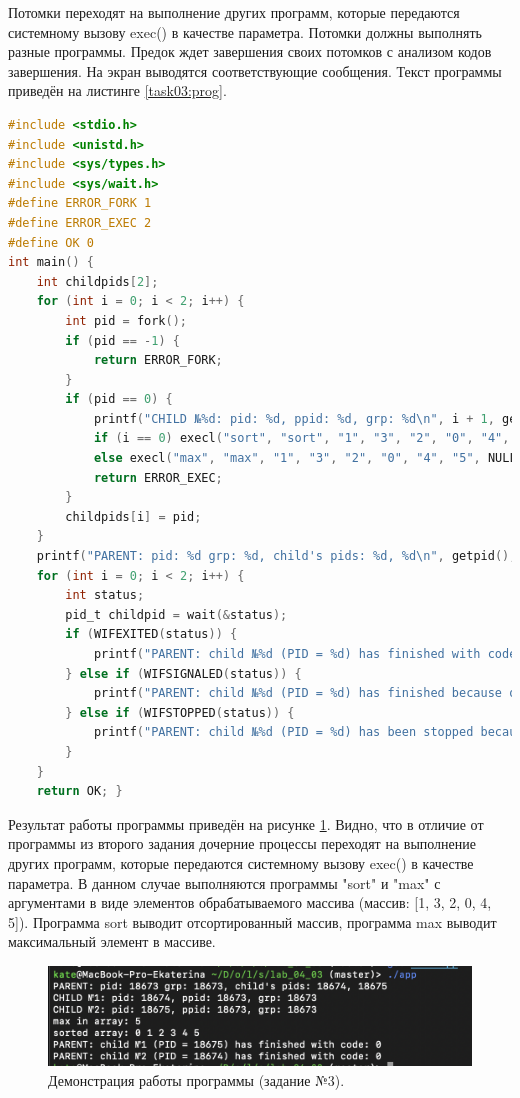 \documentclass[12pt]{report}
\begin{document}
Потомки переходят на выполнение других программ, которые передаются системному вызову exec() в качестве параметра. Потомки должны выполнять разные программы. Предок ждет завершения своих потомков с анализом кодов завершения. На экран выводятся соответствующие сообщения. Текст программы приведён на листинге \ref{task03:prog}.

\begin{lstlisting}[label=task03:prog,caption=Системный вызов exec(),language=C]
#include <stdio.h>
#include <unistd.h>
#include <sys/types.h>
#include <sys/wait.h>
#define ERROR_FORK 1
#define ERROR_EXEC 2
#define OK 0
int main() {
    int childpids[2];
    for (int i = 0; i < 2; i++) {
        int pid = fork();
        if (pid == -1) {
            return ERROR_FORK;
        }
        if (pid == 0) {
            printf("CHILD №%d: pid: %d, ppid: %d, grp: %d\n", i + 1, getpid(), getppid(), getpgrp());
            if (i == 0) execl("sort", "sort", "1", "3", "2", "0", "4", "5", NULL);
            else execl("max", "max", "1", "3", "2", "0", "4", "5", NULL);
            return ERROR_EXEC;
        }
        childpids[i] = pid;
    }
    printf("PARENT: pid: %d grp: %d, child's pids: %d, %d\n", getpid(), getpgrp(), childpids[0], childpids[1]);
    for (int i = 0; i < 2; i++) {
        int status;
        pid_t childpid = wait(&status);
        if (WIFEXITED(status)) {
            printf("PARENT: child №%d (PID = %d) has finished with code: %d\n", i + 1, childpid, WEXITSTATUS(status));
        } else if (WIFSIGNALED(status)) {
            printf("PARENT: child №%d (PID = %d) has finished because of signal: %d\n", i + 1, childpid, WTERMSIG(status));
        } else if (WIFSTOPPED(status)) {
            printf("PARENT: child №%d (PID = %d) has been stopped because of signal: %d\n", i + 1, childpid, WSTOPSIG(status));
        }
    }
    return OK; }
\end{lstlisting}

Результат работы программы приведён на рисунке \ref{task03:demo}. Видно, что в отличие от программы из второго задания дочерние процессы переходят на выполнение других программ, которые передаются системному вызову exec() в качестве параметра. В данном случае выполняются программы "sort" и "max" с аргументами в виде элементов обрабатываемого массива (массив: [1, 3, 2, 0, 4, 5]). Программа sort выводит отсортированный массив, программа max выводит максимальный элемент в массиве. 
\begin{figure}[H]
	\centering
	\includegraphics[width=\linewidth]{task03.png}
	\caption{Демонстрация работы программы (задание №3).}
	\label{task03:demo}

\end{figure}
\newpage
\end{document}
